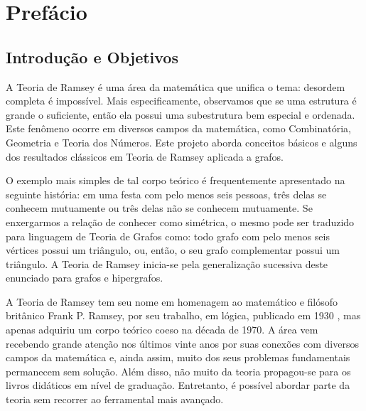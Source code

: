 
\chapter{Prefácio}

\section*{Introdução e Objetivos}

A Teoria de Ramsey é uma área da matemática que unifica o tema: desordem completa é impossível. Mais especificamente, observamos que se uma estrutura é grande o suficiente, então ela possui uma subestrutura bem especial e ordenada. Este fenômeno ocorre em diversos campos da matemática, como Combinatória, Geometria e Teoria dos Números. Este projeto aborda conceitos básicos e alguns dos resultados clássicos em Teoria de Ramsey aplicada a grafos.

O exemplo mais simples de tal corpo teórico é frequentemente apresentado na seguinte história: em uma festa com pelo menos seis pessoas, três delas se conhecem mutuamente ou três delas não se conhecem mutuamente. Se enxergarmos a relação de conhecer como simétrica, o mesmo pode ser traduzido para linguagem de Teoria de Grafos como: todo grafo com pelo menos seis vértices possui um triângulo, ou, então, o seu grafo complementar possui um triângulo. A Teoria de Ramsey inicia-se pela generalização sucessiva deste enunciado para grafos e hipergrafos.

A Teoria de Ramsey tem seu nome em homenagem ao matemático e filósofo britânico Frank P. Ramsey, por seu trabalho, em lógica, publicado em 1930 \cite{ramsey}, mas apenas adquiriu um corpo teórico coeso na década de 1970. A área vem recebendo grande atenção nos últimos vinte anos por suas conexões com diversos campos da matemática e, ainda assim, muito dos seus problemas fundamentais permanecem sem solução. Além disso, não muito da teoria propagou-se para os livros didáticos em nível de graduação. Entretanto, é possível abordar parte da teoria sem recorrer ao ferramental mais avançado.

